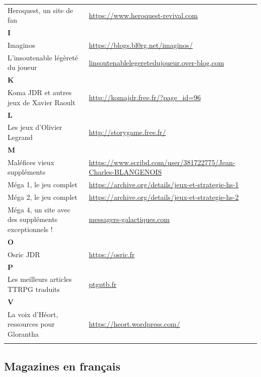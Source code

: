 \documentclass[a4paper, 11pt, twoside]{article}
\begin{document}
\begin{longtable}{p{7cm}p{7cm}}
Heroquest, un site de fan & \url{https://www.heroquest-revival.com}\\
\textbf{I} & \\
Imaginos & \url{https://blogs.bl0rg.net/imaginos/}\\
L'insoutenable légèreté du joueur & \href{http://linsoutenablelegeretedujoueur.over-blog.com/}{linsoutenablelegeretedujoueur.over-blog.com}\\
\textbf{K} & \\
Koma JDR et autres jeux de Xavier Raoult & \url{http://komajdr.free.fr/?page\_id=96}\\
\textbf{L} & \\
Les jeux d'Olivier Legrand & \url{http://storygame.free.fr/}\\
\textbf{M} & \\
Maléfices vieux suppléments & \url{https://www.scribd.com/user/381722775/Jean-Charles-BLANGENOIS}\\
Méga 1, le jeu complet & \url{https://archive.org/details/jeux-et-strategie-hs-1}\\
Méga 2, le jeu complet & \url{https://archive.org/details/jeux-et-strategie-hs-2}\\
Méga 4, un site avec des suppléments exceptionnels ! & \href{https://www.messagers-galactiques.com}{messagers-galactiques.com}\\
\textbf{O} & \\
Osric JDR & \url{https://osric.fr}\\
\textbf{P} & \\
Les meilleurs articles TTRPG traduits & \href{https://ptgptb.fr}{ptgptb.fr}\\
\textbf{V} & \\
La voix d'Héort, ressources pour Glorantha & \url{https://heort.wordpress.com/}\\
 & \\
\end{longtable}

\subsection{Magazines en français}
\label{sec:org9916e61}
\end{document}
